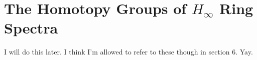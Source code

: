 \section{The Homotopy Groups of $H_{\infty}$ Ring Spectra}

I will do this later.  I think I'm allowed to refer to these though in section 6.  Yay.  

